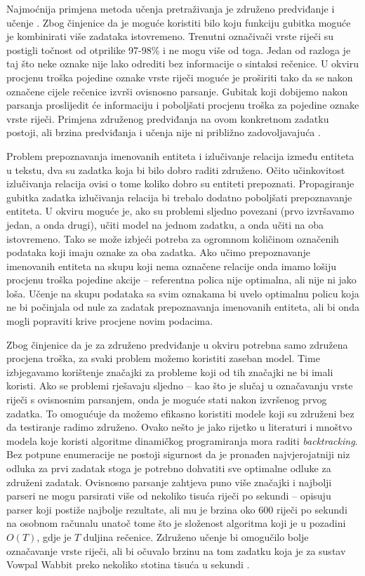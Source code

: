 Najmoćnija primjena metoda učenja pretraživanja je združeno predviđanje i učenje
. Zbog činjenice da je moguće koristiti bilo
koju funkciju gubitka moguće je kombinirati više zadataka istovremeno. Trenutni
označivači vrste riječi su postigli točnost od otprilike 97-98\%
\citep{manning2011part} i ne mogu više od toga. Jedan od razloga je taj što neke
oznake nije lako odrediti bez informacije o sintaksi rečenice. U \lts{}
okviru procjenu troška pojedine oznake vrste riječi moguće je proširiti tako da
se nakon označene cijele rečenice izvrši ovisnosno parsanje. Gubitak koji
dobijemo nakon parsanja proslijedit će informaciju i poboljšati procjenu troška
za pojedine oznake vrste riječi. Primjena združenog predviđanja na ovom
konkretnom zadatku postoji, ali brzina predviđanja i učenja nije ni približno
zadovoljavajuća \citep{bohnet2012transition}.

Problem prepoznavanja imenovanih entiteta i izlučivanje relacija između entiteta
u tekstu, dva su zadatka koja bi bilo dobro raditi združeno. Očito učinkovitost
izlučivanja relacija ovisi o tome koliko dobro su entiteti prepoznati.
Propagiranje gubitka zadatka izlučivanja relacija bi trebalo dodatno poboljšati
prepoznavanje entiteta. U \lts{} okviru moguće je, ako su problemi sljedno
povezani (prvo izvršavamo jedan, a onda drugi), učiti model na jednom zadatku, a
onda učiti na oba istovremeno. Tako se može izbjeći potreba za ogromnom
količinom označenih podataka koji imaju oznake za oba zadatka. Ako učimo
prepoznavanje imenovanih entiteta na skupu koji nema označene relacije onda
imamo lošiju procjenu troška pojedine akcije -- referentna polica nije
optimalna, ali nije ni jako loša. Učenje na skupu podataka sa svim oznakama bi
uvelo optimalnu policu koja ne bi počinjala od nule za zadatak prepoznavanja
imenovanih entiteta, ali bi onda mogli popraviti krive procjene novim podacima.

Zbog činjenice da je za združeno predviđanje u \lts{} okviru potrebna samo
združena procjena troška, za svaki problem možemo koristiti zaseban model. Time
izbjegavamo korištenje značajki za probleme koji od tih značajki ne bi imali
koristi. Ako se problemi rješavaju sljedno -- kao što je slučaj u označavanju
vrste riječi s ovisnosnim parsanjem, onda je moguće stati nakon izvršenog prvog
zadatka. To omogućuje da možemo efikasno koristiti modele koji su združeni bez
da testiranje radimo združeno. Ovako nešto je jako rijetko u literaturi i
mnoštvo modela koje koristi algoritme dinamičkog programiranja mora raditi
\textit{backtracking}. Bez potpune enumeracije ne postoji sigurnost da je
pronađen najvjerojatniji niz odluka za prvi zadatak stoga je potrebno dohvatiti
sve optimalne odluke za združeni zadatak. Ovisnosno parsanje zahtjeva puno više
značajki i najbolji parseri ne mogu parsirati više od nekoliko tisuća riječi po
sekundi -- \citet{andor2016globally} opisuju parser koji postiže najbolje
rezultate, ali mu je brzina oko 600 riječi po sekundi na osobnom računalu unatoč
tome što je složenost algoritma koji je u pozadini $O(T)$, gdje je $T$ duljina
rečenice. Združeno učenje bi omogučilo bolje označavanje vrste riječi, ali bi
očuvalo brzinu na tom zadatku koja je za sustav Vowpal Wabbit preko nekoliko
stotina tisuća u sekundi \citep{daume14lts}.
